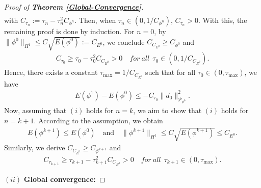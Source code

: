 \documentclass[preprint,3p]{elsarticle}
\begin{document}
\begin{proof}[Proof of {\bf Theorem \ref{Global-Convergence}}]
\begin{align*}
	\end{align*}
	with $C_{\tau_n}:=\tau_n-\tau_n^2C_{\phi^n}.$
	Then, when $\tau_n\in(0,1/C_{\phi^n})$, $C_{\tau_n}>0$. With this, the remaining proof is done by induction. For $n=0$, by $\big\|\phi^0\big\|_{H^1}\le C\sqrt{E(\phi^0)}:=C_{E^0}$, we conclude $C_{C_{E^0}}\ge C_{\phi^0}$ and 
	\begin{align*}
		C_{\tau_0}\ge\tau_0-\tau_0^2C_{C_{E^0}}>0\quad for\ all\ \ \tau_0\in\left(0,1/C_{C_{E^0}}\right).
	\end{align*}
	Hence, there exists a constant $\tau_{\max}=1/C_{C_{E^0}}$  such that for all $\tau_0\in (0,\tau_{\max})$, we have
	\begin{align*}
		E(\phi^{1})-E(\phi^0)\le -C_{\tau_0}\|d_0\|^2_{\mathcal{P}_{\phi^0}}.
	\end{align*}
	Now, assuming that $(i)$ holds for $n=k$, we aim to show that $(i)$ holds for $n=k+1$. According to the assumption, we obtain
	\begin{align*}
		E(\phi^{k+1})\le E(\phi^0)\quad\text{and}\quad \|\phi^{k+1}\|_{H^1}\le C\sqrt{E(\phi^{k+1})}\le C_{E^0}.
	\end{align*}
	Similarly, we derive $C_{C_{E^0}}\ge C_{\phi^{k+1}}$ and 
	\begin{align*}
		C_{\tau_{k+1}}\ge\tau_{k+1}-\tau_{k+1}^2C_{C_{E^0}}>0\quad for\ all\ \ \tau_{k+1}\in(0,\tau_{\max}).
	\end{align*} 
	
	\noindent$(ii)$ {\bf Global convergence:}
	

\end{proof}
\end{document}
